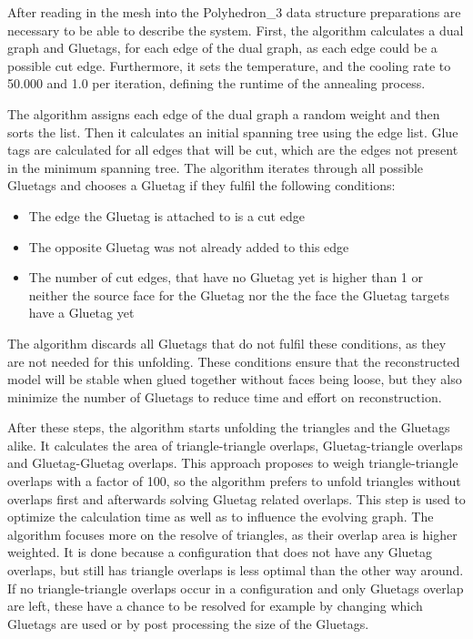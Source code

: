 \documentclass[draft,final]{vutinfth} %
\begin{document}
After reading in the mesh into the Polyhedron\_3 data structure preparations are necessary to be able to describe the system. First, the algorithm calculates a dual graph and Gluetags, for each edge of the dual graph, as each edge could be a possible cut edge. Furthermore, it sets the temperature, and the cooling rate to 50.000 and 1.0 per iteration, defining the runtime of the annealing process.

The algorithm assigns each edge of the dual graph a random weight and then sorts the list. Then it calculates an initial spanning tree using the edge list. Glue tags are calculated for all edges that will be cut, which are the edges not present in the minimum spanning tree. The algorithm iterates through all possible Gluetags and chooses a Gluetag if they fulfil the following conditions:

\begin{itemize}
	\item The edge the Gluetag is attached to is a cut edge
	\item The opposite Gluetag was not already added to this edge
	\item The number of cut edges, that have no Gluetag yet is higher than 1 or neither the source face for the Gluetag nor the the face the Gluetag targets have a Gluetag yet
\end{itemize}

The algorithm discards all Gluetags that do not fulfil these conditions, as they are not needed for this unfolding. These conditions ensure that the reconstructed model will be stable when glued together without faces being loose, but they also minimize the number of Gluetags to reduce time and effort on reconstruction.

After these steps, the algorithm starts unfolding the triangles and the Gluetags alike. It calculates the area of triangle-triangle overlaps, Gluetag-triangle overlaps and Gluetag-Gluetag overlaps. This approach proposes to weigh triangle-triangle overlaps with a factor of 100, so the algorithm prefers to unfold triangles without overlaps first and afterwards solving Gluetag related overlaps. This step is used to optimize the calculation time as well as to influence the evolving graph. The algorithm focuses more on the resolve of triangles, as their overlap area is higher weighted. It is done because a configuration that does not have any Gluetag overlaps, but still has triangle overlaps is less optimal than the other way around. If no triangle-triangle overlaps occur in a configuration and only Gluetags overlap are left, these have a chance to be resolved for example by changing which Gluetags are used or by post processing the size of the Gluetags.
\end{document}
